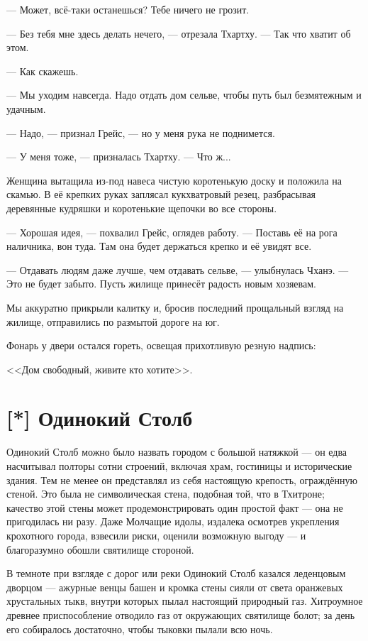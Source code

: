 --- Может, всё-таки останешься?
Тебе ничего не грозит.

--- Без тебя мне здесь делать нечего, --- отрезала Тхартху.
--- Так что хватит об этом.

--- Как скажешь.

--- Мы уходим навсегда.
Надо отдать дом сельве, чтобы путь был безмятежным и удачным.

--- Надо, --- признал Грейс, --- но у меня рука не поднимется.

--- У меня тоже, --- призналась Тхартху.
--- Что ж...

Женщина вытащила из-под навеса чистую коротенькую доску и положила на скамью.
В её крепких руках заплясал кукхватровый резец, разбрасывая деревянные кудряшки и коротенькие щепочки во все стороны.

--- Хорошая идея, --- похвалил Грейс, оглядев работу.
--- Поставь её на рога наличника, вон туда.
Там она будет держаться крепко и её увидят все.

--- Отдавать людям даже лучше, чем отдавать сельве, --- улыбнулась Чханэ.
--- Это не будет забыто.
Пусть жилище принесёт радость новым хозяевам.

Мы аккуратно прикрыли калитку и, бросив последний прощальный взгляд на жилище, отправились по размытой дороге на юг.

Фонарь у двери остался гореть, освещая прихотливую резную надпись:

<<Дом свободный, живите кто хотите>>.

\section{[*] Одинокий Столб}

Одинокий Столб можно было назвать городом с большой натяжкой --- он едва насчитывал полторы сотни строений, включая храм, гостиницы и исторические здания.
Тем не менее он представлял из себя настоящую крепость, ограждённую стеной.
Это была не символическая стена, подобная той, что в Тхитроне;
качество этой стены может продемонстрировать один простой факт --- она не пригодилась ни разу.
Даже Молчащие идолы, издалека осмотрев укрепления крохотного города, взвесили риски, оценили возможную выгоду --- и благоразумно обошли святилище стороной.

В темноте при взгляде с дорог или реки Одинокий Столб казался леденцовым дворцом --- ажурные венцы башен и кромка стены сияли от света оранжевых хрустальных тыкв, внутри которых пылал настоящий природный газ.
Хитроумное древнее приспособление отводило газ от окружающих святилище болот;
за день его собиралось достаточно, чтобы тыковки пылали всю ночь.

